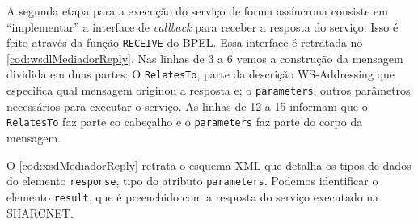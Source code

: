 \documentclass[12pt]{report} %
\begin{document}
 	    
		
	A segunda etapa para a execução do serviço de forma assíncrona consiste em ``implementar'' a interface de \textit{callback} para receber a resposta do serviço.
	Isso é feito através da função \texttt{RECEIVE} do BPEL.
	Essa interface é retratada no \autoref{cod:wsdlMediadorReply}.
	Nas linhas de 3 a 6 vemos a construção da mensagem dividida em duas partes: O \texttt{RelatesTo}, parte da descrição WS-Addressing que especifica qual mensagem originou a resposta e; o \texttt{parameters}, outros parâmetros necessários para executar o serviço.
	As linhas de 12 a 15 informam que o \texttt{RelatesTo} faz parte co cabeçalho e o \texttt{parameters} faz parte do corpo da mensagem.
	
 	    
	
	O \autoref{cod:xsdMediadorReply} retrata o esquema XML que detalha os tipos de dados do elemento \texttt{response}, tipo do atributo \texttt{parameters}.
	Podemos identificar o elemento \texttt{result}, que é preenchido com a resposta do serviço executado na SHARCNET.		
	
 	    
	
\end{document}
